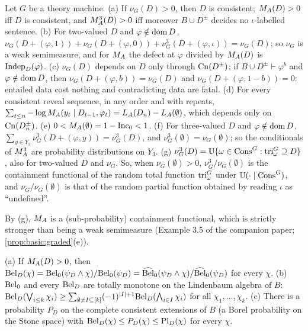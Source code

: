 \begin{proposition}[Structure]\label{prop:basic:structure}
Let $G$ be a theory machine. (a) If $\nu_G(D)>0$, then $D$ is consistent; $M_{A}(D)>0$ iff $D$ is consistent, and $M_{A}^{3}(D)>0$ iff moreover $B\cup D^\pm$ decides no $\iota$-labelled sentence. (b) For two-valued $D$ and $\varphi\notin\operatorname{dom} D$, $\nu_G(D+(\varphi,1))+\nu_G(D+(\varphi,0))+\nu^3_G(D+(\varphi,\iota))=\nu_G(D)$; so $\nu_G$ is a weak semimeasure, and for $M_{A}$ the defect at $\varphi$ divided by $M_{A}(D)$ is $\mathrm{Indep}_D(\varphi)$. (c) $\nu_G(D)$ depends on $D$ only through $\mathrm{Cn}(D^\pm)$; if $B\cup D^\pm\vdash\varphi^b$ and $\varphi\notin\operatorname{dom} D$, then $\nu_G(D+(\varphi,b))=\nu_G(D)$ and $\nu_G(D+(\varphi,1-b))=0$: entailed data cost nothing and contradicting data are fatal. (d) For every consistent reveal sequence, in any order and with repeats, $\sum_{t\le n}-\log M_{A}(y_t\mid D_{t-1},\varphi_t)=L_{A}(D_n)-L_{A}(\emptyset)$, which depends only on $\mathrm{Cn}(D_n^\pm)$. (e) $0<M_{A}(\emptyset)=1-\mathrm{Inc}_0<1$. (f) For three-valued $D$ and $\varphi\notin\operatorname{dom} D$, $\sum_{y\in Y_3}\nu^3_G(D+(\varphi,y))=\nu^3_G(D)$, and $\nu^3_G(\emptyset)=\nu_G(\emptyset)$; so the conditionals of $M_{A}^{3}$ are probability distributions on $Y_3$. (g) $\nu^3_G(D)=\mathbb{U}\{\omega\in\mathrm{Cons}^G:\mathrm{tri}^G_\omega\supseteq D\}$, also for two-valued $D$ and $\nu_G$. So, when $\nu_G(\emptyset)>0$, $\nu^3_G/\nu_G(\emptyset)$ is the containment functional of the random total function $\mathrm{tri}^G_\omega$ under $\mathbb{U}(\cdot\mid\mathrm{Cons}^G)$, and $\nu_G/\nu_G(\emptyset)$ is that of the random partial function obtained by reading $\iota$ as ``undefined''.
\end{proposition}

By (g), $M_{A}$ is a (sub-probability) containment functional, which is strictly stronger than being a weak semimeasure (Example 3.5 of the companion paper; \cref{prop:basic:graded}(e)).

\begin{proposition}\label{prop:basic:geometric}
(a) If $M_{A}(D)>0$, then $\mathrm{Bel}_D(\chi)=\mathrm{Bel}_0(\psi_D\wedge\chi)/\mathrm{Bel}_0(\psi_D)=\widehat{\mathrm{Bel}}_0(\psi_D\wedge\chi)/\widehat{\mathrm{Bel}}_0(\psi_D)$ for every $\chi$. (b) $\mathrm{Bel}_0$ and every $\mathrm{Bel}_D$ are totally monotone on the Lindenbaum algebra of $B$: $\mathrm{Bel}_D(\bigvee_{i\le k}\chi_i)\ge\sum_{\emptyset\ne I\subseteq[k]}(-1)^{\lvert I\rvert+1}\mathrm{Bel}_D(\bigwedge_{i\in I}\chi_i)$ for all $\chi_1,\dots,\chi_k$. (c) There is a probability $P_D$ on the complete consistent extensions of $B$ (a Borel probability on the Stone space) with $\mathrm{Bel}_D(\chi)\le P_D(\chi)\le\mathrm{Pl}_D(\chi)$ for every $\chi$.
\end{proposition}

